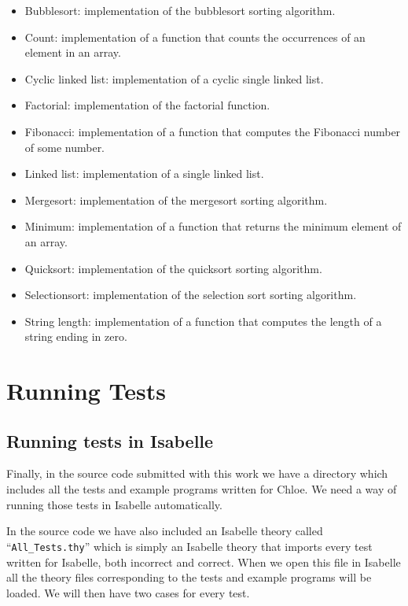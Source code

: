 \begin{itemize}
  \item{Bubblesort: implementation of the bubblesort sorting algorithm.}
  \item{Count: implementation of a function that counts the occurrences of an element in an array.}
  \item{Cyclic linked list: implementation of a cyclic single linked list.}
  \item{Factorial: implementation of the factorial function.}
  \item{Fibonacci: implementation of a function that computes the Fibonacci number of some number.}
  \item{Linked list: implementation of a single linked list.}
  \item{Mergesort: implementation of the mergesort sorting algorithm.}
  \item{Minimum: implementation of a function that returns the minimum element of an array.}
  \item{Quicksort: implementation of the quicksort sorting algorithm.}
  \item{Selectionsort: implementation of the selection sort sorting algorithm.}
  \item{String length: implementation of a function that computes the length of a string ending in zero.}
\end{itemize}

\section{Running Tests}

\subsection{Running tests in Isabelle}

Finally, in the source code submitted with this work we have a directory which includes all the tests and example programs written for Chloe.
We need a way of running those tests in Isabelle automatically.

In the source code we have also included an Isabelle theory called ``\verb|All_Tests.thy|'' which is simply an Isabelle theory that imports every test written for Isabelle, both incorrect and correct.
When we open this file in Isabelle all the theory files corresponding to the tests and example programs will be loaded.
We will then have two cases for every test.

